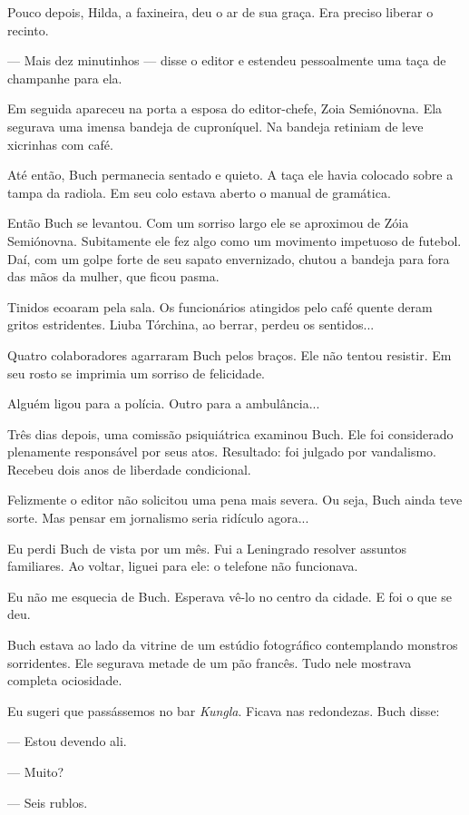 Pouco depois, Hilda, a faxineira, deu o ar de sua graça. Era preciso
liberar o recinto.

--- Mais dez minutinhos --- disse o editor e estendeu pessoalmente uma
taça de champanhe para ela.

Em seguida apareceu na porta a esposa do editor-chefe, Zoia Semiónovna.
Ela segurava uma imensa bandeja de cuproníquel. Na bandeja retiniam de
leve xicrinhas com café.

Até então, Buch permanecia sentado e quieto. A taça ele havia colocado
sobre a tampa da radiola. Em seu colo estava aberto o manual de
gramática.

Então Buch se levantou. Com um sorriso largo ele se aproximou de Zóia
Semiónovna. Subitamente ele fez algo como um movimento impetuoso de
futebol. Daí, com um golpe forte de seu sapato envernizado, chutou a
bandeja para fora das mãos da mulher, que ficou pasma.

Tinidos ecoaram pela sala. Os funcionários atingidos pelo café quente
deram gritos estridentes. Liuba Tórchina, ao berrar, perdeu os
sentidos...

Quatro colaboradores agarraram Buch pelos braços. Ele não tentou
resistir. Em seu rosto se imprimia um sorriso de felicidade.

Alguém ligou para a polícia. Outro para a ambulância...

Três dias depois, uma comissão psiquiátrica examinou Buch. Ele foi
considerado plenamente responsável por seus atos. Resultado: foi julgado
por vandalismo. Recebeu dois anos de liberdade condicional.

Felizmente o editor não solicitou uma pena mais severa. Ou seja, Buch
ainda teve sorte. Mas pensar em jornalismo seria ridículo agora...

Eu perdi Buch de vista por um mês. Fui a Leningrado resolver assuntos
familiares. Ao voltar, liguei para ele: o telefone não funcionava.

Eu não me esquecia de Buch. Esperava vê-lo no centro da cidade. E foi o
que se deu.

Buch estava ao lado da vitrine de um estúdio fotográfico contemplando
monstros sorridentes. Ele segurava metade de um pão francês. Tudo nele
mostrava completa ociosidade.

Eu sugeri que passássemos no bar \emph{Kungla}. Ficava nas redondezas.
Buch disse:

--- Estou devendo ali.

--- Muito?

--- Seis rublos.

